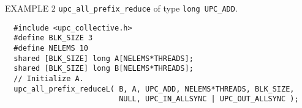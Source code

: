 %
%
%
%
%
%
%
\np EXAMPLE 2 {\tt upc\_all\_prefix\_reduce} of type {\tt long UPC\_ADD}.

\begin{verbatim}
  #include <upc_collective.h>
  #define BLK_SIZE 3
  #define NELEMS 10
  shared [BLK_SIZE] long A[NELEMS*THREADS];
  shared [BLK_SIZE] long B[NELEMS*THREADS];
  // Initialize A.
  upc_all_prefix_reduceL( B, A, UPC_ADD, NELEMS*THREADS, BLK_SIZE,
                          NULL, UPC_IN_ALLSYNC | UPC_OUT_ALLSYNC );
\end{verbatim}

